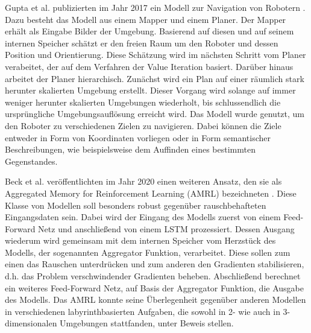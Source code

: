 Gupta et al. publizierten im Jahr 2017 ein Modell zur Navigation von Robotern \cite{MappingPlanning}. Dazu besteht das Modell aus einem Mapper und einem Planer. Der Mapper erhält als Eingabe Bilder der Umgebung. Basierend auf diesen und auf seinem internen Speicher schätzt er den freien Raum um den Roboter und dessen Position und Orientierung. Diese Schätzung wird im nächsten Schritt vom Planer verabeitet, der auf dem Verfahren der Value Iteration basiert. Darüber hinaus arbeitet der Planer hierarchisch. Zunächst wird ein Plan auf einer räumlich stark herunter skalierten Umgebung erstellt. Dieser Vorgang wird solange auf immer weniger herunter skalierten Umgebungen wiederholt, bis schlussendlich die ursprüngliche Umgebungsauflösung erreicht wird. Das Modell wurde genutzt, um den Roboter zu verschiedenen Zielen zu navigieren. Dabei können die Ziele entweder in Form von Koordinaten vorliegen oder in Form semantischer Beschreibungen, wie beispielsweise dem Auffinden eines bestimmten Gegenstandes.

Beck et al. veröffentlichten im Jahr 2020 einen weiteren Ansatz, den sie als Aggregated Memory for Reinforcement Learning (AMRL) bezeichneten \cite{AMRL}. Diese Klasse von Modellen soll besonders robust gegenüber rauschbehafteten Eingangsdaten sein. Dabei wird der Eingang des Modells zuerst von einem Feed-Forward Netz und anschließend von einem LSTM prozessiert. Dessen Ausgang wiederum wird gemeinsam mit dem internen Speicher vom Herzstück des Modells, der sogenannten Aggregator Funktion, verarbeitet. Diese sollen zum einen das Rauschen unterdrücken und zum anderen den Gradienten stabilisieren, d.h. das Problem verschwindender Gradienten beheben. Abschließend berechnet ein weiteres Feed-Forward Netz, auf Basis der Aggregator Funktion, die Ausgabe des Modells. Das AMRL konnte seine Überlegenheit gegenüber anderen Modellen in verschiedenen labyrinthbasierten Aufgaben, die sowohl in 2- wie auch in 3-dimensionalen Umgebungen stattfanden, unter Beweis stellen.
